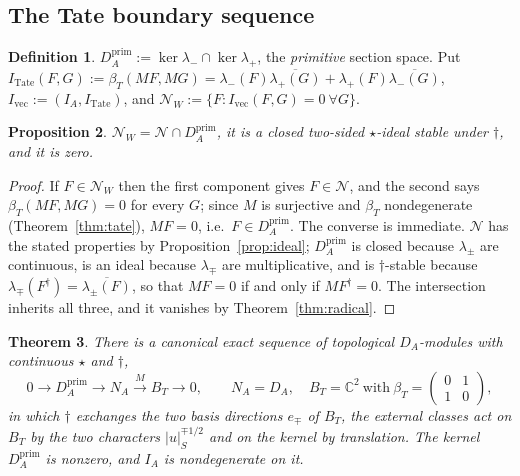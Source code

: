 \documentclass[11pt]{amsart}
\newtheorem{theorem}{Theorem}[section]
\newtheorem{proposition}[theorem]{Proposition}
\theoremstyle{definition}
\newtheorem{definition}[theorem]{Definition}
\theoremstyle{remark}
\newcommand{\C}{\mathbb C}
\newcommand{\DA}{D_A}
\newcommand{\Nrad}{\mathcal N}
\newcommand{\BT}{B_T}
\begin{document}
\subsection{The Tate boundary sequence}

\begin{definition}\label{def:prim}
$\DA^{\mathrm{prim}}:=\ker\lambda_-\cap\ker\lambda_+$, the \emph{primitive}
section space.  Put
$I_{\mathrm{Tate}}(F,G):=\beta_T(MF,MG)=\lambda_-(F)\overline{\lambda_+(G)}
+\lambda_+(F)\overline{\lambda_-(G)}$,
$I_{\mathrm{vec}}:=(I_A,I_{\mathrm{Tate}})$, and
$\Nrad_W:=\{F:I_{\mathrm{vec}}(F,G)=0\ \forall G\}$.
\end{definition}

\begin{proposition}\label{prop:NW}
$\Nrad_W=\Nrad\cap\DA^{\mathrm{prim}}$, it is a closed two-sided
$\star$-ideal stable under $\dagger$, and it is zero.
\end{proposition}

\begin{proof}
If $F\in\Nrad_W$ then the first component gives $F\in\Nrad$, and the second
says $\beta_T(MF,MG)=0$ for every $G$; since $M$ is surjective and $\beta_T$
nondegenerate (Theorem~\ref{thm:tate}), $MF=0$, i.e.\
$F\in\DA^{\mathrm{prim}}$.  The converse is immediate.  $\Nrad$ has the stated
properties by Proposition~\ref{prop:ideal}; $\DA^{\mathrm{prim}}$ is closed
because $\lambda_{\pm}$ are continuous, is an ideal because $\lambda_{\mp}$ are
multiplicative, and is $\dagger$-stable because
$\lambda_{\mp}(F^{\dagger})=\overline{\lambda_{\pm}(F)}$, so that $MF=0$ if and
only if $MF^{\dagger}=0$.  The intersection inherits all three, and it vanishes
by Theorem~\ref{thm:radical}.
\end{proof}

\begin{theorem}\label{thm:tateseq}
There is a canonical exact sequence of topological $\DA$-modules with
continuous $\star$ and $\dagger$,
\begin{equation}\label{eq:tateseq}
0\longrightarrow \DA^{\mathrm{prim}}\longrightarrow N_A
\stackrel{M}{\longrightarrow}\BT\longrightarrow 0,\qquad N_A=\DA,\quad
\BT=\C^{2}\ \text{with}\
\beta_T=\begin{pmatrix}0&1\\1&0\end{pmatrix},
\end{equation}
in which $\dagger$ exchanges the two basis directions $e_{\mp}$ of $\BT$, the
external classes act on $\BT$ by the two characters $|u|_S^{\mp1/2}$ and on the
kernel by translation.  The kernel $\DA^{\mathrm{prim}}$ is nonzero, and $I_A$
is nondegenerate on it.
\end{theorem}
\end{document}
